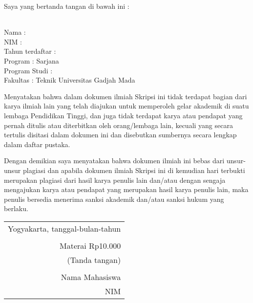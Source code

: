 \noindent Saya yang bertanda tangan di bawah ini :

\vspace{-1em}

\begin{tabbing}
\hspace{40mm} \= \\ %
\noindent Nama \> : \\[\parskip]
\noindent NIM \> :  \\[\parskip]
\noindent Tahun terdaftar \> :  \\[\parskip]
\noindent Program \> : Sarjana \\[\parskip]
\noindent Program Studi \> :  \\[\parskip]
\noindent Fakultas \> : Teknik Universitas Gadjah Mada
\end{tabbing}

\noindent Menyatakan bahwa dalam dokumen ilmiah Skripsi ini tidak terdapat bagian dari karya ilmiah lain yang telah diajukan untuk memperoleh gelar akademik di suatu lembaga Pendidikan Tinggi, dan juga tidak terdapat karya atau pendapat yang pernah ditulis atau diterbitkan oleh orang/lembaga lain, kecuali yang secara tertulis disitasi dalam dokumen ini dan disebutkan sumbernya secara lengkap dalam daftar pustaka.

\noindent Dengan demikian saya menyatakan bahwa dokumen ilmiah ini bebas dari unsur-unsur plagiasi dan apabila dokumen ilmiah Skripsi ini di kemudian hari terbukti merupakan plagiasi dari hasil karya penulis lain dan/atau dengan sengaja mengajukan karya atau pendapat yang merupakan hasil karya penulis lain, maka penulis bersedia menerima sanksi akademik dan/atau sanksi hukum yang berlaku.


\begin{flushright}
	\begin{tabular}{r}
		Yogyakarta, tanggal-bulan-tahun \\
		\vspace{0.1cm} \\
		\tiny{Materai Rp10.000} \\
		\tiny{(Tanda tangan)} \\	
		\vspace{0.1cm} \\
		Nama Mahasiswa \\ NIM
	\end{tabular}
\end{flushright}